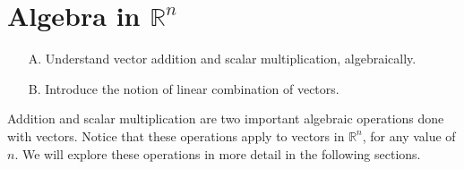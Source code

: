 \section{Algebra in \texorpdfstring{$\mathbb{R}^{n}$}{Rn}}

\begin{outcome}
\begin{enumerate}
\item[A.] Understand vector addition and scalar multiplication, algebraically. 
\item[B.] Introduce the notion of linear combination of vectors. 
\end{enumerate}
\end{outcome}

Addition and scalar multiplication are two important algebraic operations done with vectors. Notice that these operations
apply to vectors in $\mathbb{R}^{n}$, for any 
value of $n$. We will explore these operations in more detail in the following sections.
